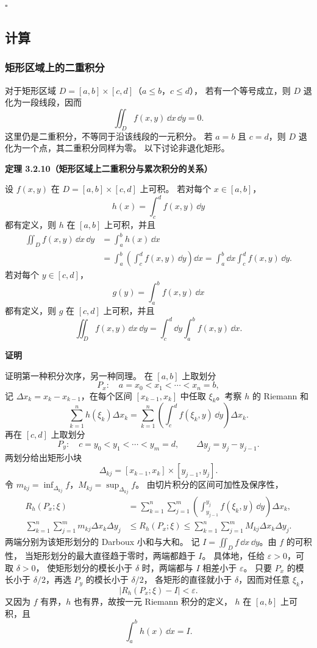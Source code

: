 $\square$



\subsection*{计算}
\subsubsection*{矩形区域上的二重积分}

对于矩形区域 $D=[a,b]\times[c,d]$（$a\le b$，$c\le d$），
若有一个等号成立，则 $D$ 退化为一段线段，因而
\[
\iint_D f(x,y)\,\dd x\,\dd y=0.
\]
这里仍是二重积分，不等同于沿该线段的一元积分。
若 $a=b$ 且 $c=d$，则 $D$ 退化为一个点，其二重积分同样为零。
以下讨论非退化矩形。



\textbf{定理 3.2.10（矩形区域上二重积分与累次积分的关系）}


设 $f(x,y)$ 在 $D=[a,b]\times[c,d]$ 上可积。
若对每个 $x\in[a,b]$，
\[
h(x)=\int_c^d f(x,y)\,\dd y
\]
都有定义，则 $h$ 在 $[a,b]$ 上可积，并且
\[
\begin{aligned}
\iint_D f(x,y)\,\dd x\,\dd y
&=\int_a^b h(x)\,\dd x\\
&=\int_a^b\left(\int_c^d f(x,y)\,\dd y\right)\dd x
=\int_a^b\dd x\int_c^d f(x,y)\,\dd y.
\end{aligned}
\]
若对每个 $y\in[c,d]$，
\[
g(y)=\int_a^b f(x,y)\,\dd x
\]
都有定义，则 $g$ 在 $[c,d]$ 上可积，并且
\[
\iint_D f(x,y)\,\dd x\,\dd y
=\int_c^d\dd y\int_a^b f(x,y)\,\dd x.
\]






\textbf{证明}

证明第一种积分次序，另一种同理。
在 $[a,b]$ 上取划分
\[
P_x:\quad a=x_0<x_1<\cdots<x_n=b,
\]
记 $\Delta x_k=x_k-x_{k-1}$，在每个区间 $[x_{k-1},x_k]$
中任取 $\xi_k$。考察 $h$ 的 Riemann 和
\[
\sum_{k=1}^n h(\xi_k)\Delta x_k
=\sum_{k=1}^n\left(\int_c^d f(\xi_k,y)\,\dd y\right)\Delta x_k.
\]
再在 $[c,d]$ 上取划分
\[
P_y:\quad c=y_0<y_1<\cdots<y_m=d,
\qquad \Delta y_j=y_j-y_{j-1}.
\]
两划分给出矩形小块
\[
\Delta_{kj}=[x_{k-1},x_k]\times[y_{j-1},y_j].
\]
令 $m_{kj}=\inf_{\Delta_{kj}}f$，$M_{kj}=\sup_{\Delta_{kj}}f$。
由切片积分的区间可加性及保序性，
\[
\begin{aligned}
R_h(P_x;\xi)
&=\sum_{k=1}^n\sum_{j=1}^m
\left(\int_{y_{j-1}}^{y_j}f(\xi_k,y)\,\dd y\right)\Delta x_k,\\
\sum_{k=1}^n\sum_{j=1}^m m_{kj}\Delta x_k\Delta y_j
&\le R_h(P_x;\xi)
\le\sum_{k=1}^n\sum_{j=1}^m M_{kj}\Delta x_k\Delta y_j.
\end{aligned}
\]
两端分别为该矩形划分的 Darboux 小和与大和。
记 $I=\displaystyle\iint_D f\,\dd x\,\dd y$。由 $f$ 的可积性，
当矩形划分的最大直径趋于零时，两端都趋于 $I$。
具体地，任给 $\varepsilon>0$，可取 $\delta>0$，
使矩形划分的模长小于 $\delta$ 时，两端都与 $I$ 相差小于 $\varepsilon$。
只要 $P_x$ 的模长小于 $\delta/2$，再选 $P_y$ 的模长小于 $\delta/2$，
各矩形的直径就小于 $\delta$，因而对任意 $\xi_k$，
\[
|R_h(P_x;\xi)-I|<\varepsilon.
\]
又因为 $f$ 有界，$h$ 也有界，故按一元 Riemann 积分的定义，
$h$ 在 $[a,b]$ 上可积，且
\[
\int_a^b h(x)\,\dd x=I.
\]


